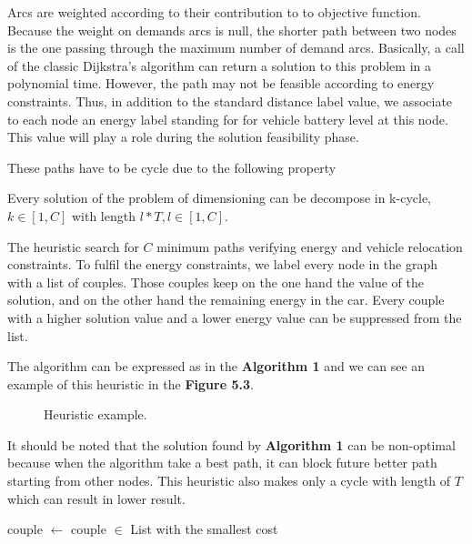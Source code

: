 \begin{bibunit}[ieeetr]
Arcs are weighted according to their contribution to to objective function.
Because the weight on demands arcs is null, the shorter path between two nodes is the one passing through the maximum number of demand arcs.
Basically, a call of the classic Dijkstra's algorithm can return a solution to this problem in a polynomial time.
However, the path may not be feasible according to energy constraints.
Thus, in addition to the standard distance label value, we associate to each node an energy label standing for for vehicle battery level at this node.
This value will play a role during the solution feasibility phase.



These paths have to be cycle due to the following property 
\begin{prop}
Every solution of the problem of dimensioning can be decompose in k-cycle, $k \in [1,C]$ with length $l*T, l\in [1,C]$.
\end{prop}

The heuristic search for $C$ minimum paths verifying energy and vehicle relocation constraints.
To fulfil the energy constraints, we label every node in the graph with a list of couples.
Those couples keep on the one hand the value of the solution, and on the other hand the remaining energy in the car.
Every couple with a higher solution value and a lower energy value can be suppressed from the list.

The algorithm can be expressed as in the \textbf{Algorithm 1} and we can see an example of this heuristic in the \textbf{Figure 5.3}.

\begin{figure}[t]
\begin{center}
\scalebox{.9}{}
\end{center}
\caption{Heuristic example.}
\label{fig:heuristicExample}
\end{figure}

It should be noted that the solution found by \textbf{Algorithm 1} can be non-optimal because when the algorithm take a best path, it can block future better path starting from other nodes. 
This heuristic also makes only a cycle with length of $T$ which can result in lower result.

\begin{algorithm}
\DontPrintSemicolon %
 {
couple $\gets$ couple $\in$ List with the smallest cost\;
 }
\end{algorithm}
\end{bibunit}
